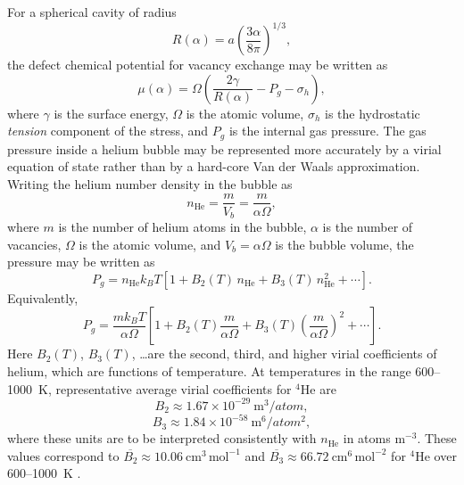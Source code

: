 \documentclass[pdflatex,sn-basic]{sn-jnl} %
\begin{document}
For a spherical cavity of radius
\begin{equation}
    R(\alpha)=a\left(\frac{3\alpha}{8\pi}\right)^{1/3},
\end{equation}
the defect chemical potential for vacancy exchange may be written as
\begin{equation}
    \mu(\alpha)=\Omega\left(\frac{2\gamma}{R(\alpha)}-P_g - \sigma_h\right),
    \label{eq:Dw}
\end{equation}
where $\gamma$ is the surface energy, $\Omega$ is the atomic volume, $\sigma_h$ is the hydrostatic \emph{tension} component of the stress, and $P_g$ is the internal gas pressure. The gas pressure inside a helium bubble may be represented more accurately by a virial equation of state rather than by a hard-core Van der Waals approximation. Writing the helium number density in the bubble as
\begin{equation}
    n_{\mathrm{He}}=\frac{m}{V_b}=\frac{m}{\alpha\Omega},
\end{equation}
where $m$ is the number of helium atoms in the bubble, $\alpha$ is the number of vacancies, $\Omega$ is the atomic volume, and $V_b=\alpha\Omega$ is the bubble volume, the pressure may be written as
\begin{equation}
    P_g = n_{\mathrm{He}} k_B T
    \left[
    1 + B_2(T)\,n_{\mathrm{He}} + B_3(T)\,n_{\mathrm{He}}^2 + \cdots
    \right].
    \label{eq:P1}
\end{equation}
Equivalently,
\begin{equation}
    P_g = \frac{m k_B T}{\alpha\Omega}
    \left[
    1 + B_2(T)\frac{m}{\alpha\Omega}
      + B_3(T)\left(\frac{m}{\alpha\Omega}\right)^2
      + \cdots
    \right].
\end{equation}
Here $B_2(T)$, $B_3(T)$, \dots are the second, third, and higher virial coefficients of helium, which are functions of temperature. At temperatures in the range 600--1000~K, representative average virial
coefficients for $^4$He are
\begin{equation}
    B_2 \approx 1.67\times 10^{-29}\ \mathrm{m^3}/atom,
\end{equation}
\begin{equation}
    B_3 \approx 1.84\times 10^{-58}\ \mathrm{m^6}/atom^2,
\end{equation}
where these units are to be interpreted consistently with
$n_{\mathrm{He}}$ in atoms m$^{-3}$. These values correspond to
$\overline{B_2}\approx 10.06~\mathrm{cm^3\,mol^{-1}}$ and
$\overline{B_3}\approx 66.72~\mathrm{cm^6\,mol^{-2}}$
for $^4$He over 600--1000~K \cite{Hurly2000HeliumStandards,Garberoglio2009HeliumC}.
\end{document}
